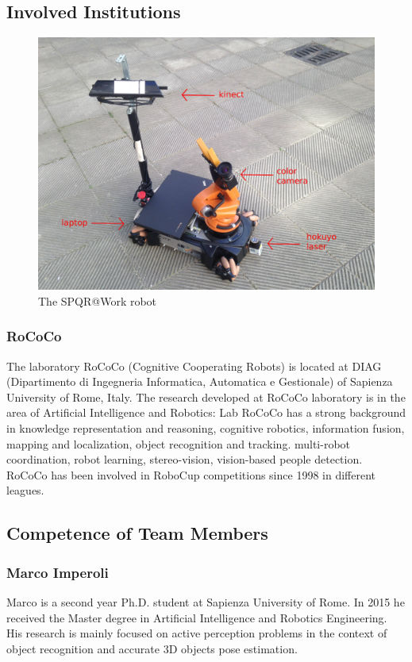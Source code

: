 \documentclass{llncs}
\begin{document}
\subsection{Involved Institutions}
\begin{figure}[t!]
\begin{center}
\includegraphics[width=0.8\linewidth]{images/kuka.JPG}
\end{center}
\caption{The SPQR@Work robot}\label{fig:robot}
\end{figure}

\subsubsection{RoCoCo} The laboratory RoCoCo (Cognitive Cooperating Robots) is located at DIAG (Dipartimento di Ingegneria Informatica, Automatica e Gestionale) of Sapienza University of Rome, Italy.
The research developed at RoCoCo laboratory is in the area of Artificial Intelligence and Robotics: Lab RoCoCo has a strong background in knowledge representation and reasoning, cognitive robotics, information fusion, mapping and localization, object recognition and tracking. multi-robot coordination, robot learning, stereo-vision, vision-based people detection. RoCoCo has been involved in RoboCup competitions since 1998 in different leagues.\\

\subsection{Competence of Team Members}

\subsubsection*{Marco Imperoli}
Marco is a second year Ph.D. student at Sapienza University of Rome. 
In 2015 he received the Master degree in Artificial Intelligence and Robotics Engineering. 
His research is mainly focused on active perception problems in the context of object recognition and accurate 3D objects pose estimation. 
\end{document}
